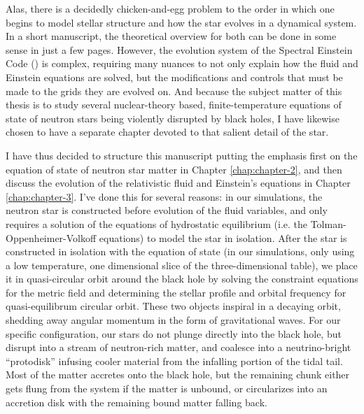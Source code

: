 Alas, there is a decidedly chicken-and-egg problem to the order in which one begins to model stellar structure and how the star evolves in a dynamical system.
In a short manuscript, the theoretical overview for both can be done in some sense in just a few pages. 
However, the evolution system of the Spectral Einstein Code (\SpEC) is complex, requiring many nuances to not only explain how the fluid and Einstein equations are solved, but the modifications and controls that must be made to the grids they are evolved on.
And because the subject matter of this thesis is to study several nuclear-theory based, finite-temperature equations of state of neutron stars being violently disrupted by black holes, I have likewise chosen to have a separate chapter devoted to that salient detail of the star.

I have thus decided to structure this manuscript putting the emphasis first on the equation of state of neutron star matter in Chapter \ref{chap:chapter-2}, and then discuss the evolution of the relativistic fluid and Einstein's equations in Chapter \ref{chap:chapter-3}.  
I've done this for several reasons: 
in our simulations, the neutron star is constructed before evolution of the fluid variables, and only requires a solution of the equations of hydrostatic equilibrium (i.e. the Tolman-Oppenheimer-Volkoff equations) to model the star in isolation.  
After the star is constructed in isolation with the equation of state (in our simulations, only using a low temperature, one dimensional slice of the three-dimensional table), we place it in quasi-circular orbit around the black hole by solving the constraint equations for the metric field and determining the stellar profile and orbital frequency for quasi-equilibrum circular orbit.
These two objects inspiral in a decaying orbit, shedding away angular momentum in the form of gravitational waves.  
For our specific configuration, our stars do not plunge directly into the black hole, but disrupt into a stream of neutron-rich matter, and coalesce into a neutrino-bright ``protodisk'' infusing cooler material from the infalling portion of the tidal tail. 
Most of the matter accretes onto the black hole, but the remaining chunk either gets flung from the system if the matter is unbound, or circularizes into an accretion disk with the remaining bound matter falling back.
